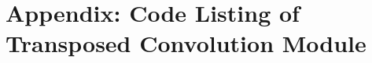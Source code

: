 
\chapter{Appendix: Code Listing of Transposed Convolution Module}\label{appx:verilog_listing}

\begin{code}
  \inputminted{verilog}{code/transposed_convolution.v}
  \label{code:transposed_convolution}
\end{code}

\clearpage %
